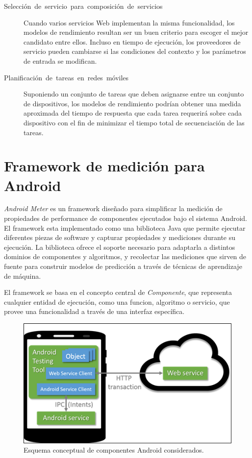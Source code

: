 \begin{description}
\item [{Selección~de~servicio~para~composición~de~servicios}] Cuando
varios servicios Web implementan la misma funcionalidad, los modelos
de rendimiento resultan ser un buen criterio para escoger el mejor
candidato entre ellos. Incluso en tiempo de ejecución, los proveedores
de servicio pueden cambiarse si las condiciones del contexto y los
parámetros de entrada se modifican. 
\item [{Planificación~de~tareas~en~redes~móviles}] Suponiendo un conjunto
de tareas que deben asignarse entre un conjunto de dispositivos, los
modelos de rendimiento podrían obtener una medida aproximada del tiempo
de respuesta que cada tarea requerirá sobre cada dispositivo con el
fin de minimizar el tiempo total de secuenciación de las tareas.
\end{description}

\section{Framework de medición para Android\label{subsec:Framework-de-medici=0000F3n}}

\emph{Android Meter} es un framework diseñado para simplificar la
medición de propiedades de performance de componentes ejecutados bajo
el sistema Android. El framework esta implementado como una biblioteca
Java que permite ejecutar diferentes piezas de software y capturar
propiedades y mediciones durante su ejecución. La biblioteca ofrece
el soporte necesario para adaptarla a distintos dominios de componentes
y algoritmos, y recolectar las mediciones que sirven de fuente para
construir modelos de predicción a través de técnicas de aprendizaje
de máquina. 

El framework se basa en el concepto central de \emph{Componente},
que representa cualquier entidad de ejecución, como una funcion, algoritmo
o servicio, que provee una funcionalidad a través de una interfaz
específica. 

\begin{figure}
\begin{centering}
\includegraphics[scale=0.7]{images/android-component}
\par\end{centering}

\caption{Esquema conceptual de componentes Android considerados. \label{fig:android-component}}
\end{figure}


